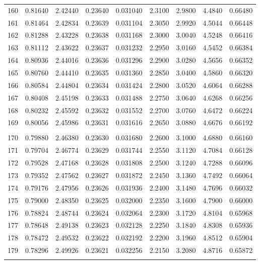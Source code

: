 \documentclass[letter,twosides,10pt]{article}
\begin{document}
\begin{longtable}{|c|c|c|c|c|c|c|c|c|}
160 & 0.81640 & 2.42440 & 0.23640 & 0.031040 & 2.3100 & 2.9800 & 4.4840 & 0.66480 \\
161 & 0.81464 & 2.42834 & 0.23639 & 0.031104 & 2.3050 & 2.9920 & 4.5044 & 0.66448 \\
162 & 0.81288 & 2.43228 & 0.23638 & 0.031168 & 2.3000 & 3.0040 & 4.5248 & 0.66416 \\
163 & 0.81112 & 2.43622 & 0.23637 & 0.031232 & 2.2950 & 3.0160 & 4.5452 & 0.66384 \\
164 & 0.80936 & 2.44016 & 0.23636 & 0.031296 & 2.2900 & 3.0280 & 4.5656 & 0.66352 \\
165 & 0.80760 & 2.44410 & 0.23635 & 0.031360 & 2.2850 & 3.0400 & 4.5860 & 0.66320 \\
166 & 0.80584 & 2.44804 & 0.23634 & 0.031424 & 2.2800 & 3.0520 & 4.6064 & 0.66288 \\
167 & 0.80408 & 2.45198 & 0.23633 & 0.031488 & 2.2750 & 3.0640 & 4.6268 & 0.66256 \\
168 & 0.80232 & 2.45592 & 0.23632 & 0.031552 & 2.2700 & 3.0760 & 4.6472 & 0.66224 \\
169 & 0.80056 & 2.45986 & 0.23631 & 0.031616 & 2.2650 & 3.0880 & 4.6676 & 0.66192 \\
 & & & & & & & & \\
170 & 0.79880 & 2.46380 & 0.23630 & 0.031680 & 2.2600 & 3.1000 & 4.6880 & 0.66160 \\
171 & 0.79704 & 2.46774 & 0.23629 & 0.031744 & 2.2550 & 3.1120 & 4.7084 & 0.66128 \\
172 & 0.79528 & 2.47168 & 0.23628 & 0.031808 & 2.2500 & 3.1240 & 4.7288 & 0.66096 \\
173 & 0.79352 & 2.47562 & 0.23627 & 0.031872 & 2.2450 & 3.1360 & 4.7492 & 0.66064 \\
174 & 0.79176 & 2.47956 & 0.23626 & 0.031936 & 2.2400 & 3.1480 & 4.7696 & 0.66032 \\
175 & 0.79000 & 2.48350 & 0.23625 & 0.032000 & 2.2350 & 3.1600 & 4.7900 & 0.66000 \\
176 & 0.78824 & 2.48744 & 0.23624 & 0.032064 & 2.2300 & 3.1720 & 4.8104 & 0.65968 \\
177 & 0.78648 & 2.49138 & 0.23623 & 0.032128 & 2.2250 & 3.1840 & 4.8308 & 0.65936 \\
178 & 0.78472 & 2.49532 & 0.23622 & 0.032192 & 2.2200 & 3.1960 & 4.8512 & 0.65904 \\
179 & 0.78296 & 2.49926 & 0.23621 & 0.032256 & 2.2150 & 3.2080 & 4.8716 & 0.65872 \\
 & & & & & & & & \\

\end{longtable}
\end{document}
